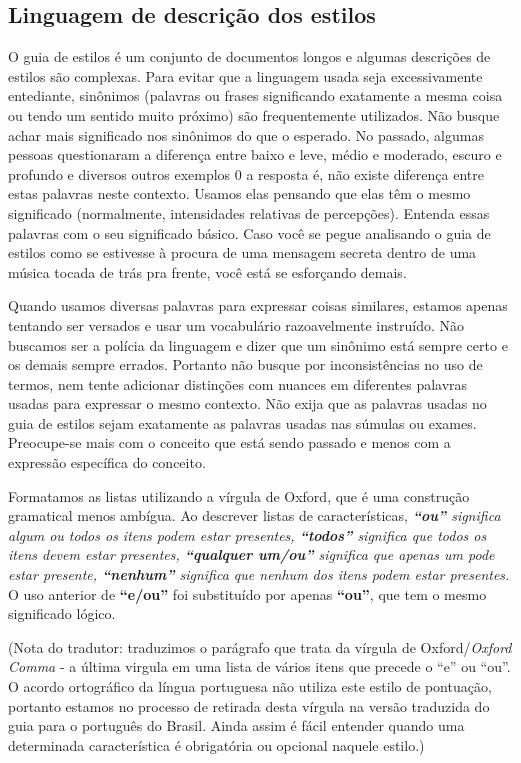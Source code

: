 \subsection*{Linguagem de descrição dos estilos}

O guia de estilos é um conjunto de documentos longos e algumas descrições de estilos são complexas. Para evitar que a linguagem usada seja excessivamente entediante, sinônimos (palavras ou frases significando exatamente a mesma coisa ou tendo um sentido muito próximo) são frequentemente utilizados. Não busque achar mais significado nos sinônimos do que o esperado. No passado, algumas pessoas questionaram a diferença entre baixo e leve, médio e moderado, escuro e profundo e diversos outros exemplos 0 a resposta é, não existe diferença entre estas palavras neste contexto. Usamos elas pensando que elas têm o mesmo significado (normalmente, intensidades relativas de percepções). Entenda essas palavras com o seu significado básico. Caso você se pegue analisando o guia de estilos como se estivesse à procura de uma mensagem secreta dentro de uma música tocada de trás pra frente, você está se esforçando demais.

Quando usamos diversas palavras para expressar coisas similares, estamos apenas tentando ser versados e usar um vocabulário razoavelmente instruído. Não buscamos ser a polícia da linguagem e dizer que um sinônimo está sempre certo e os demais sempre errados. Portanto não busque por inconsistências no uso de termos, nem tente adicionar distinções com nuances em diferentes palavras usadas para expressar o mesmo contexto. Não exija que as palavras usadas no guia de estilos sejam exatamente as palavras usadas nas súmulas ou exames. Preocupe-se mais com o conceito que está sendo passado e menos com a expressão específica do conceito.

Formatamos as listas utilizando a vírgula de Oxford, que é uma construção gramatical menos ambígua. Ao descrever listas de características, \textit{\textbf{“ou”} significa algum ou todos os itens podem estar presentes, \textbf{“todos”} significa que todos os itens devem estar presentes, \textbf{“qualquer um/ou”} significa que apenas um pode estar presente, \textbf{“nenhum”} significa que nenhum dos itens podem estar presentes.} O uso anterior de \textbf{“e/ou”} foi substituído por apenas \textbf{“ou”}, que tem o mesmo significado lógico.

(Nota do tradutor: traduzimos o parágrafo que trata da vírgula de Oxford/\textit{Oxford Comma} - a última virgula em uma lista de vários itens que precede o “e” ou “ou”. O acordo ortográfico da língua portuguesa não utiliza este estilo de pontuação, portanto estamos no processo de retirada desta vírgula na versão traduzida do guia para o português do Brasil. Ainda assim é fácil entender quando uma determinada característica é obrigatória ou opcional naquele estilo.)

